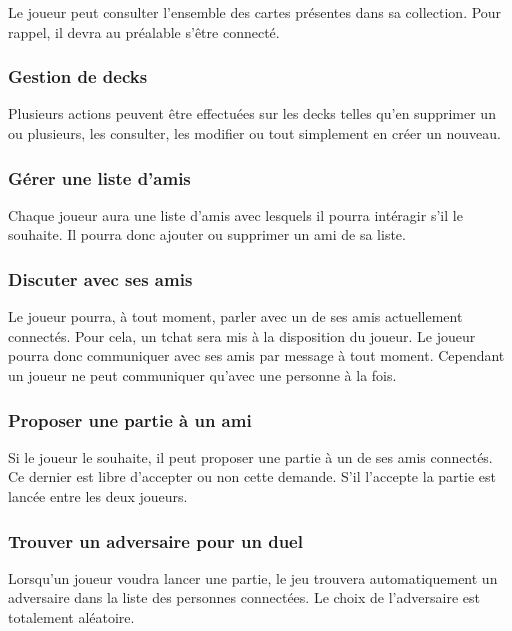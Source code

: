 \documentclass[11pt,a4paper]{article}
\begin{document}
Le joueur peut consulter l'ensemble des cartes présentes dans sa
\gls{collection}. Pour rappel, il devra au préalable s'être connecté.


\subsubsection*{Gestion de decks}

Plusieurs actions peuvent être effectuées sur les
\gls{deck}s telles qu'en supprimer un ou plusieurs, les consulter, les
modifier ou tout simplement en créer un nouveau.


\subsubsection*{Gérer une liste d'amis}

Chaque joueur aura une liste d'amis avec lesquels il pourra
intéragir s'il le souhaite. Il pourra donc ajouter ou supprimer un ami de sa liste.


\subsubsection*{Discuter avec ses amis}

Le joueur pourra, à tout moment, parler avec un de ses
amis actuellement connectés. Pour cela, un \gls{tchat} sera mis à la 
disposition du joueur.  Le joueur pourra donc communiquer avec ses
amis par message à tout moment. Cependant un joueur ne peut communiquer qu'avec une personne à la fois.

\subsubsection*{Proposer une partie à un ami}

Si le joueur le souhaite, il peut proposer une partie à un de ses
amis connectés. Ce dernier est libre d'accepter ou non cette demande.
S'il l'accepte la partie est lancée entre les deux joueurs.


\subsubsection*{Trouver un adversaire pour un duel}

Lorsqu'un joueur voudra lancer une partie, le jeu trouvera
automatiquement un adversaire dans la liste des personnes
connectées. Le choix de l'adversaire est totalement aléatoire.
\end{document}
